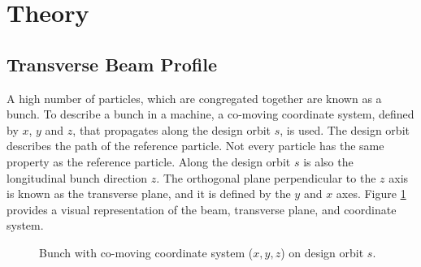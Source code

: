 \documentclass{article}
\begin{document}
\newpage
\section{Theory}

\subsection{Transverse Beam Profile}

A high number of particles, which are congregated together are known as a bunch. To describe a bunch in a machine, a co-moving coordinate system, defined by $x$, $y$ and $z$, that propagates along the design orbit $s$, is used. The design orbit describes the path of the reference particle. Not every particle has the same property as the reference particle. Along the design orbit $s$ is also the longitudinal bunch direction $z$. The orthogonal plane perpendicular to the $z$ axis is known as the transverse plane, and it is defined by the $y$ and $x$ axes. Figure \ref{fig:2} provides a visual representation of the beam, transverse plane, and coordinate system.
    
\begin{figure}[h!]
    \centering
    
    \caption{Bunch with co-moving coordinate system ($x, y, z$) on design orbit $s$.}
    \label{fig:2}
\end{figure}
\end{document}
